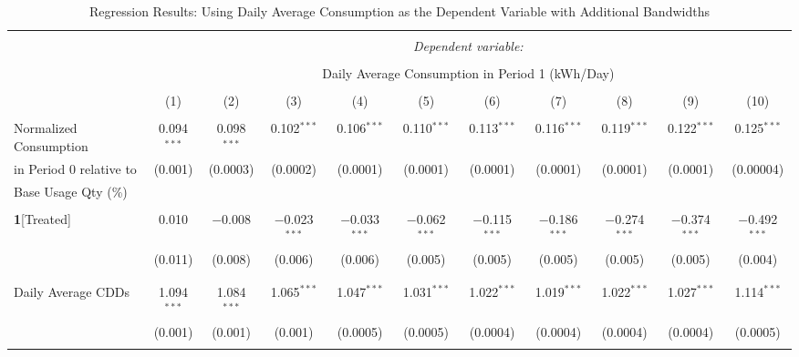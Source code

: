 \begin{table}[!htbp] \centering 
\caption{Regression Results: Using Daily Average Consumption as the Dependent Variable with Additional Bandwidths} 
\label{Table:Regression-Results_Additional-Bandwidths} 
\small 

\begin{adjustbox}{scale = 0.9}

\begin{tabular}{@{\extracolsep{5pt}}lcccccccccc} 
\\[-1.8ex]\hline 
\hline \\[-1.8ex] 
 & \multicolumn{10}{c}{\textit{Dependent variable:}} \\ 
\cline{2-11} 
\\[-1.8ex] & \multicolumn{10}{c}{Daily Average Consumption in Period 1 (kWh/Day)} \\ 
\\[-1.8ex] & (1) & (2) & (3) & (4) & (5) & (6) & (7) & (8) & (9) & (10)\\ 
\hline \\[-1.8ex] 
 Normalized Consumption & 0.094$^{***}$ & 0.098$^{***}$ & 0.102$^{***}$ & 0.106$^{***}$ & 0.110$^{***}$ & 0.113$^{***}$ & 0.116$^{***}$ & 0.119$^{***}$ & 0.122$^{***}$ & 0.125$^{***}$ \\ 
 in Period 0 relative to  & (0.001) & (0.0003) & (0.0002) & (0.0001) & (0.0001) & (0.0001) & (0.0001) & (0.0001) & (0.0001) & (0.00004) \\ 
 Base Usage Qty (\%) & & & & & & & & & & \\ 
  & & & & & & & & & & \\ 
 \textbf{1}[Treated] & 0.010 & $-$0.008 & $-$0.023$^{***}$ & $-$0.033$^{***}$ & $-$0.062$^{***}$ & $-$0.115$^{***}$ & $-$0.186$^{***}$ & $-$0.274$^{***}$ & $-$0.374$^{***}$ & $-$0.492$^{***}$ \\ 
  & (0.011) & (0.008) & (0.006) & (0.006) & (0.005) & (0.005) & (0.005) & (0.005) & (0.005) & (0.004) \\ 
  & & & & & & & & & & \\
  & & & & & & & & & & \\ 
 Daily Average CDDs & 1.094$^{***}$ & 1.084$^{***}$ & 1.065$^{***}$ & 1.047$^{***}$ & 1.031$^{***}$ & 1.022$^{***}$ & 1.019$^{***}$ & 1.022$^{***}$ & 1.027$^{***}$ & 1.114$^{***}$ \\ 
  & (0.001) & (0.001) & (0.001) & (0.0005) & (0.0005) & (0.0004) & (0.0004) & (0.0004) & (0.0004) & (0.0005) \\ 
  & & & & & & & & & & \\ 

\end{tabular}
\end{adjustbox}
\end{table}
